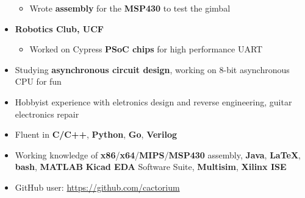 \documentclass{my_resume}
\begin{document}
\begin{itemize}
\begin{itemize}
            \item Wrote \textbf{assembly} for the \textbf{MSP430} to test the gimbal
        \end{itemize}
    \item \textbf{Robotics Club, UCF}
        \begin{itemize}
            \item Worked on Cypress \textbf{PSoC chips} for high performance UART
        \end{itemize}
    \item Studying \textbf{asynchronous circuit design}, working on 8-bit asynchronous
        CPU for fun
    \item Hobbyist experience with eletronics design and reverse engineering, guitar electronics
        repair
    \item Fluent in \textbf{C/C++}, \textbf{Python}, \textbf{Go}, \textbf{Verilog}
	\item Working knowledge of \textbf{x86}/\textbf{x64}/\textbf{MIPS}/\textbf{MSP430} assembly,
            \textbf{Java}, \textbf{LaTeX}, \textbf{bash}, \textbf{MATLAB}
            \textbf{Kicad EDA} Software Suite, \textbf{Multisim}, \textbf{Xilinx ISE}
    \item GitHub user: \url{https://github.com/cactorium}
\end{itemize}
\end{document}
